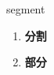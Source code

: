 
\begin{frame}
{\huge segment}
\begin{center}
\begin{enumerate}\Large
  \item \textbf{分割}
  \item \textbf{部分}
\end{enumerate}
\end{center}
\end{frame}
